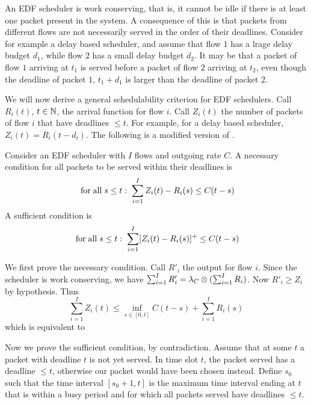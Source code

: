 An EDF scheduler is work conserving, that is, it cannot be idle if
there is at least one packet present in the system. A consequence
of this is that packets from different flows are not necessarily
served in the order of their deadlines. Consider for example a
delay based scheduler, and assume that flow $1$ has a lrage delay
budget $d_1$, while flow $2$ has a small delay budget $d_2$. It
may be that a packet of flow $1$ arriving at $t_1$ is served
before a packet of flow $2$ arriving at $t_2$, even though the
deadline of packet $1$, $t_1 + d_1$ is larger than the deadline of
packet $2$.

We will now derive a general schedulability criterion for EDF
schedulers. Call $R_i(t)$, $t \in \mathbb{N}$, the arrival function for
flow $i$. Call $Z_i(t)$ the number of packets of flow $i$ that
have deadlines $\leq t$. For example, for a delay based scheduler,
$Z_i(t)=R_i(t-d_i)$. The following is a modified version of
\cite{Changbook}.

\begin{proposition}
 Consider an EDF scheduler with $I$ flows and outgoing rate $C$.
 A necessary condition for all packets to be served within their
 deadlines is
\begin{equation}\mylabel{eq-edf-cn}
 \mfa s \leq t : \;   \sum_{i=1}^{I} Z_i(t) - R_i(s) \leq C(t-s)
\end{equation}
 A sufficient condition is
 \begin{equation}\mylabel{eq-edf-cs}
 \mfa s \leq t  : \;  \sum_{i=1}^{I} [Z_i(t) - R_i(s)]^+ \leq C(t-s)
\end{equation}
\end{proposition}
\pr
We first prove the necessary condition. Call $R'_i$ the output for
flow $i$. Since the scheduler is work conserving, we have
$\sum_{i=1}^{I} R'_i = \lambda_C \otimes(\sum_{i=1}^{I} R_i)$. Now
$R'_i \geq Z_i$ by hypothesis. Thus
$$
\sum_{i=1}^{I} Z_i(t) \leq \inf_{s \in [0,t]} C(t-s) +
\sum_{i=1}^{I} R_i(s)
$$
which is equivalent to 

Now we prove the sufficient condition, by contradiction. Assume
that at some $t$ a packet with deadline $t$ is not yet served. In
time slot $t$, the packet served has a deadline $\leq t$,
otherwise our packet would have been chosen instead. Define $s_0$
such that the time interval $[s_0+1, t]$ is the maximum time
interval ending at $t$ that is within a busy period and for which
all packets served have deadlines $\leq t$.


